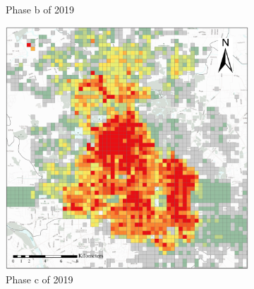 \documentclass[preprints,ijgi,submit,moreauthors]{Definitions/mdpi}
\begin{document}
\begin{figure}[ht]
\begin{subfigure}{.28\textwidth}
        \caption{Phase b of 2019}\label{fig:p_b_2019}
    \end{subfigure}
    \begin{subfigure}{.28\textwidth}
        \includegraphics[width=\textwidth]{Figures/BSSPhase3_2019.eps}
        \caption{Phase c of 2019}\label{fig:p_c_2019}
    \end{subfigure}
    \begin{subfigure}{.14\textwidth}

\end{subfigure}
\end{figure}
\end{document}
